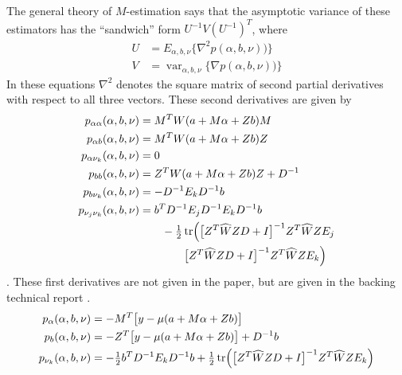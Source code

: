 \documentclass[11pt]{article}
\DeclareMathOperator{\var}{var}
\DeclareMathOperator{\tr}{tr}
\begin{document}
The general theory of $M$-estimation \citep[Section~5.3]{vdv} says
that the asymptotic variance of these estimators has the ``sandwich''
form $U^{-1} V (U^{-1})^T$, where
\begin{subequations}
\begin{align}
   U & = E_{\alpha, b, \nu} \bigl\{ \nabla^2 p(\alpha, b, \nu)) \bigr\}
   \label{eq:u}
   \\
   V & = \var_{\alpha, b, \nu} \bigl\{ \nabla p(\alpha, b, \nu)) \bigr\}
   \label{eq:v}
\end{align}
\end{subequations}
In these equations $\nabla^2$ denotes the square matrix of second partial
derivatives with respect to all three vectors. These second derivatives
are given by
\begin{align*}
   p_{\alpha \alpha}(\alpha, b, \nu)
   & =
   M^T W(a + M \alpha + Z b) M
   \\
   p_{\alpha b}(\alpha, b, \nu)
   & =
   M^T W(a + M \alpha + Z b) Z
   \\
   p_{\alpha \nu_k}(\alpha, b, \nu)
   & =
   0
   \\
   p_{b b}(\alpha, b, \nu)
   & =
   Z^T W(a + M \alpha + Z b) Z + D^{- 1}
   \\
   p_{b \nu_k}(\alpha, b, \nu)
   & =
   - D^{- 1} E_k D^{- 1} b
   \\
   p_{\nu_j \nu_k}(\alpha, b, \nu)
   & =
   b^T D^{- 1} E_j D^{- 1} E_k D^{- 1} b
   \\
   & \qquad
   -
   \tfrac{1}{2} \tr \Bigl(
   \bigl[ Z^T \widehat{W} Z D + I \bigr]^{- 1}
   Z^T \widehat{W} Z E_j
   \\
   & \qquad \qquad
   \bigl[ Z^T \widehat{W} Z D + I \bigr]^{- 1}
   Z^T \widehat{W} Z E_k
   \Bigr)
\end{align*}
\citep[unnumbered displayed equation at the end of Section~2]{reaster}.
These first derivatives are not given in the paper, but are given in
the backing technical report \citep[Section~1.7]{tr692}.
\begin{align*}
   p_\alpha(\alpha, b, \nu)
   & =
   - M^T \bigl[ y - \mu(a + M \alpha + Z b) \bigr]
   \\
   p_b(\alpha, b, \nu)
   & =
   - Z^T \bigl[ y - \mu(a + M \alpha + Z b) \bigr] + D^{- 1} b
   \\
   p_{\nu_k}(\alpha, b, \nu)
   & =
   - \tfrac{1}{2} b^T D^{- 1} E_k D^{- 1} b
   + \tfrac{1}{2} \tr \Bigl(
   \bigl[ Z^T \widehat{W} Z D + I \bigr]^{- 1}
   Z^T \widehat{W} Z E_k
   \Bigr)
\end{align*}
\end{document}

